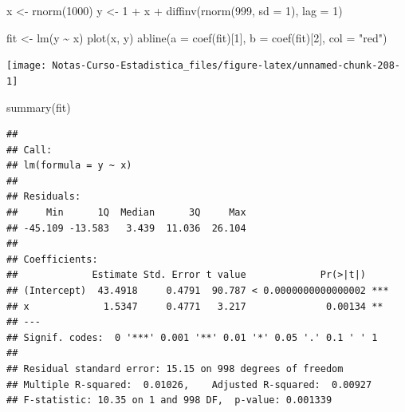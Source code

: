 \documentclass[
  12pt,
]{book}
\newenvironment{Shaded}{\begin{snugshade}}{\end{snugshade}}
\newcommand{\AttributeTok}[1]{\textcolor[rgb]{0.77,0.63,0.00}{#1}}
\newcommand{\DecValTok}[1]{\textcolor[rgb]{0.00,0.00,0.81}{#1}}
\newcommand{\FunctionTok}[1]{\textcolor[rgb]{0.00,0.00,0.00}{#1}}
\newcommand{\NormalTok}[1]{#1}
\newcommand{\OtherTok}[1]{\textcolor[rgb]{0.56,0.35,0.01}{#1}}
\newcommand{\SpecialCharTok}[1]{\textcolor[rgb]{0.00,0.00,0.00}{#1}}
\newcommand{\StringTok}[1]{\textcolor[rgb]{0.31,0.60,0.02}{#1}}
\theoremstyle{definition}
\theoremstyle{definition}
\theoremstyle{definition}
\theoremstyle{remark}
\begin{document}
\begin{Shaded}
\begin{Highlighting}[]
\NormalTok{x }\OtherTok{\textless{}{-}} \FunctionTok{rnorm}\NormalTok{(}\DecValTok{1000}\NormalTok{)}
\NormalTok{y }\OtherTok{\textless{}{-}} \DecValTok{1} \SpecialCharTok{+}\NormalTok{ x }\SpecialCharTok{+} \FunctionTok{diffinv}\NormalTok{(}\FunctionTok{rnorm}\NormalTok{(}\DecValTok{999}\NormalTok{, }\AttributeTok{sd =} \DecValTok{1}\NormalTok{), }\AttributeTok{lag =} \DecValTok{1}\NormalTok{)}
\end{Highlighting}
\end{Shaded}

\begin{Shaded}
\begin{Highlighting}[]
\NormalTok{fit }\OtherTok{\textless{}{-}} \FunctionTok{lm}\NormalTok{(y }\SpecialCharTok{\textasciitilde{}}\NormalTok{ x)}
\FunctionTok{plot}\NormalTok{(x, y)}
\FunctionTok{abline}\NormalTok{(}\AttributeTok{a =} \FunctionTok{coef}\NormalTok{(fit)[}\DecValTok{1}\NormalTok{], }\AttributeTok{b =} \FunctionTok{coef}\NormalTok{(fit)[}\DecValTok{2}\NormalTok{], }\AttributeTok{col =} \StringTok{"red"}\NormalTok{)}
\end{Highlighting}
\end{Shaded}

\begin{center}\texttt{[image: Notas-Curso-Estadistica\_files/figure-latex/unnamed-chunk-208-1]} \end{center}

\begin{Shaded}
\begin{Highlighting}[]
\FunctionTok{summary}\NormalTok{(fit)}
\end{Highlighting}
\end{Shaded}

\begin{verbatim}
## 
## Call:
## lm(formula = y ~ x)
## 
## Residuals:
##     Min      1Q  Median      3Q     Max 
## -45.109 -13.583   3.439  11.036  26.104 
## 
## Coefficients:
##             Estimate Std. Error t value             Pr(>|t|)    
## (Intercept)  43.4918     0.4791  90.787 < 0.0000000000000002 ***
## x             1.5347     0.4771   3.217              0.00134 ** 
## ---
## Signif. codes:  0 '***' 0.001 '**' 0.01 '*' 0.05 '.' 0.1 ' ' 1
## 
## Residual standard error: 15.15 on 998 degrees of freedom
## Multiple R-squared:  0.01026,    Adjusted R-squared:  0.00927 
## F-statistic: 10.35 on 1 and 998 DF,  p-value: 0.001339
\end{verbatim}
\end{document}
